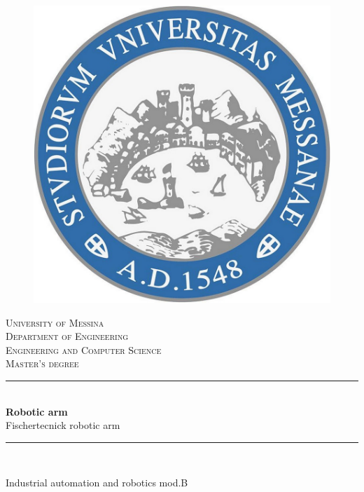 \begin{titlepage}
\changepage{}{}{}{-7.5 mm}{}{}{}{}{}

\newcommand{\HRule}{\rule{\linewidth}{0.5mm}}
\center
\begin{figure}[h]
	\centering
	\includegraphics[scale=0.13]{frontmatter/figure/Unime.jpg}
\end{figure}
\textsc{\huge University of Messina}\\[0.5cm]
\textsc{\Large Department of Engineering}\\[0.3cm]
\textsc{\Large Engineering and Computer Science}\\[0.2cm]
\textsc{\Large Master's degree}\\[1.0cm]

\HRule\\[0.8 cm]

{ \huge \bfseries Robotic arm}\\[0.2cm]
{ \large Fischertecnick robotic arm }\\[0.5 cm]
\HRule \\[1.5 cm]

\begin{minipage}[t]{0.8\textwidth}
\begin{center}
{ \large Industrial automation and robotics mod.B}\\[0.3cm]
    

\end{center}
\end{minipage}
\end{titlepage}
